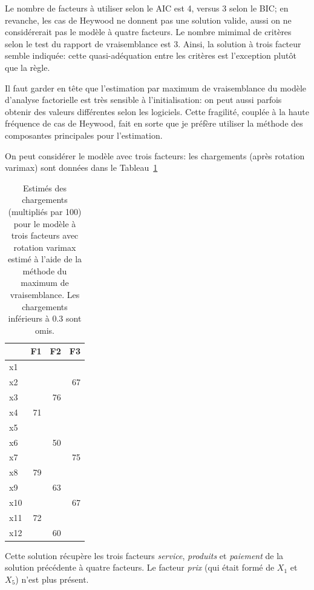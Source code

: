\documentclass[
  11pt,
  letterpaper,
]{scrbook}
\theoremstyle{definition}
\theoremstyle{remark}
\begin{document}
Le nombre de facteurs à utiliser selon le AIC est 4, versus 3 selon le
BIC; en revanche, les cas de Heywood ne donnent pas une solution valide,
aussi on ne considérerait pas le modèle à quatre facteurs. Le nombre
mimimal de critères selon le test du rapport de vraisemblance est 3.
Ainsi, la solution à trois facteur semble indiquée: cette
quasi-adéquation entre les critères est l'exception plutôt que la règle.

Il faut garder en tête que l'estimation par maximum de vraisemblance du
modèle d'analyse factorielle est très sensible à l'initialisation: on
peut aussi parfois obtenir des valeurs différentes selon les logiciels.
Cette fragilité, couplée à la haute fréquence de cas de Heywood, fait en
sorte que je préfère utiliser la méthode des composantes principales
pour l'estimation.

On peut considérer le modèle avec trois facteurs: les chargements (après
rotation varimax) sont données dans le Tableau~\ref{tbl-factanal3}

\begin{longtable}[t]{lrrr}

\caption{\label{tbl-factanal3}Estimés des chargements (multipliés par
100) pour le modèle à trois facteurs avec rotation varimax estimé à
l'aide de la méthode du maximum de vraisemblance. Les chargements
inférieurs à 0.3 sont omis.}

\tabularnewline

\toprule
 & F1 & F2 & F3\\
\midrule
x1 &  &  & \\
x2 &  &  & 67\\
x3 &  & 76 & \\
x4 & 71 &  & \\
x5 &  &  & \\
\addlinespace
x6 &  & 50 & \\
x7 &  &  & 75\\
x8 & 79 &  & \\
x9 &  & 63 & \\
x10 &  &  & 67\\
\addlinespace
x11 & 72 &  & \\
x12 &  & 60 & \\
\bottomrule

\end{longtable}

Cette solution récupère les trois facteurs \emph{service},
\emph{produits} et \emph{paiement} de la solution précédente à quatre
facteurs. Le facteur \emph{prix} (qui était formé de \(X_1\) et \(X_5\))
n'est plus présent.
\end{document}
